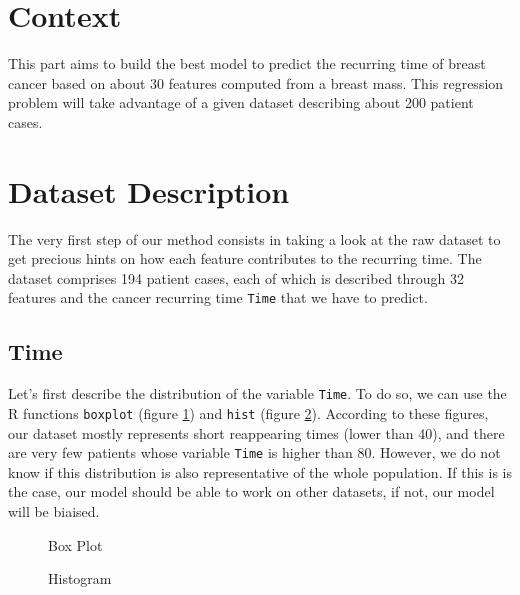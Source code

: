 \documentclass[]{report}
\newcommand{\inputtikz}[2]{%
	\scalebox{#1}{}  
}
\begin{document}
\section{Context}
This part aims to build the best model to predict the recurring time of breast cancer based on about 30 features computed from a breast mass.  This regression problem will take advantage of a given dataset describing about 200 patient cases.

\section{Dataset Description}
The very first step of our method consists in taking a look at the raw dataset to get precious hints on how each feature contributes to the recurring time. The dataset comprises 194 patient cases, each of which is described through 32 features and the cancer recurring time \texttt{Time} that we have to predict.

\subsection{Time}
Let's first describe the distribution of the variable \texttt{Time}. To do so, we can use the R functions \texttt{boxplot} (figure \ref{fig:time_boxplot}) and \texttt{hist} (figure \ref{fig:time_hist}). According to these figures, our dataset mostly represents short reappearing times (lower than 40), and there are very few patients whose variable \texttt{Time} is higher than 80. However, we do not know if this distribution is also representative of the whole population. If this is is the case, our model should be able to work on other datasets, if not, our model will be biaised.

\begin{figure}[!hb]
	\centering
	\inputtikz{0.5}{Figures/time_boxplot.tex}
	\caption{Box Plot}
	\label{fig:time_boxplot}
\end{figure}

\begin{figure}[!h]
	\centering
	\inputtikz{0.5}{Figures/time_hist.tex}
	\caption{Histogram}
	\label{fig:time_hist}
\end{figure}
\end{document}
